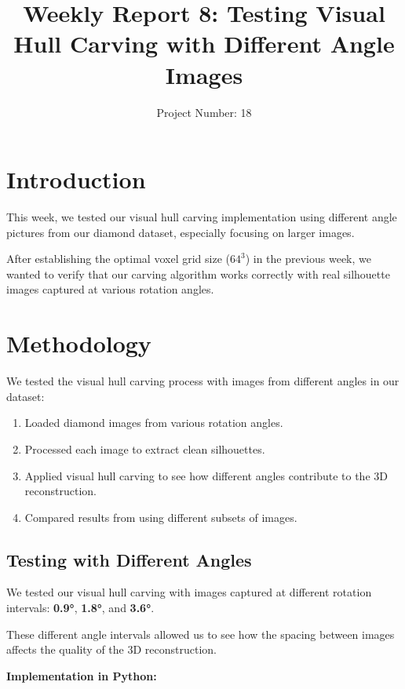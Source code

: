 \documentclass[a4paper,12pt]{article}
\title{Weekly Report 8: Testing Visual Hull Carving with Different Angle Images}
\author{Project Number: 18}
\begin{document}
\date{}

\maketitle

\section{Introduction}

This week, we tested our visual hull carving implementation using different angle pictures from our diamond dataset, especially focusing on larger images.  

After establishing the optimal voxel grid size ($64^3$) in the previous week, we wanted to verify that our carving algorithm works correctly with real silhouette images captured at various rotation angles.

\section{Methodology}

We tested the visual hull carving process with images from different angles in our dataset:

\begin{enumerate}
    \item Loaded diamond images from various rotation angles.
    \item Processed each image to extract clean silhouettes.
    \item Applied visual hull carving to see how different angles contribute to the 3D reconstruction.
    \item Compared results from using different subsets of images.
\end{enumerate}

\subsection{Testing with Different Angles}

We tested our visual hull carving with images captured at different rotation intervals: \textbf{0.9°}, \textbf{1.8°}, and \textbf{3.6°}.  

These different angle intervals allowed us to see how the spacing between images affects the quality of the 3D reconstruction.

\textbf{Implementation in Python:}
\end{document}

